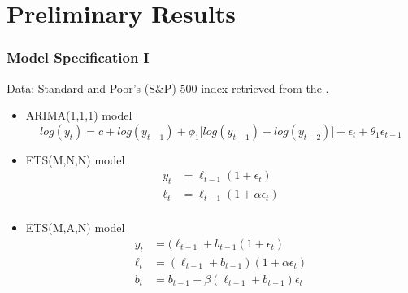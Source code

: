 
\section{Preliminary Results}


\begin{frame}
    \frametitle{Model Specification I}
    
Data: Standard and Poor’s (S\&P) 500 index retrieved from the \cite{SP500}.

\vspace{2mm}

    \begin{itemize}
    \item ARIMA(1,1,1) model 
        \begin{equation*}
        log(y_t) = c + log(y_{t-1}) + \phi_1\big[log(y_{t-1})-log(y_{t-2})\big] + \epsilon_t + \theta_1\epsilon_{t-1}
        \end{equation*}
    \item ETS(M,N,N) model
        \begin{align*}
        y_t &= \ell_{t-1} (1+\epsilon_t) \\
        \ell_t &= \ell_{t-1} (1+\alpha \epsilon_t) \\
        \end{align*}
        \vspace{-1cm}
    \item ETS(M,A,N) model
        \begin{align*}
        y_t &= (\ell_{t-1} + b_{t-1} (1+\epsilon_t) \\
        \ell_t &= (\ell_{t-1} + b_{t-1}) (1+\alpha \epsilon_t) \\
        b_t &= b_{t-1} + \beta (\ell_{t-1} + b_{t-1})\epsilon_t \\
        \end{align*}
    \end{itemize}

\end{frame}

